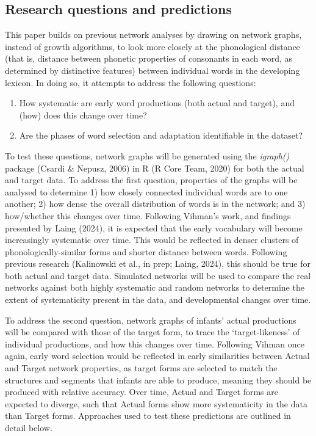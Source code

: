 \documentclass[
  man]{apa6}
\providecommand{\tightlist}{%
  \setlength{\itemsep}{0pt}\setlength{\parskip}{0pt}}
\begin{document}
\subsection{Research questions and predictions}\label{research-questions-and-predictions}

This paper builds on previous network analyses by drawing on network graphs, instead of growth algorithms, to look more closely at the phonological distance (that is, distance between phonetic properties of consonants in each word, as determined by distinctive features) between individual words in the developing lexicon. In doing so, it attempts to address the following questions:

\begin{enumerate}
\def\labelenumi{\arabic{enumi}.}
\tightlist
\item
  How systematic are early word productions (both actual and target), and (how) does this change over time?
\item
  Are the phases of word selection and adaptation identifiable in the dataset?
\end{enumerate}

To test these questions, network graphs will be generated using the \emph{igraph()} package (Csardi \& Nepusz, 2006) in R (R Core Team, 2020) for both the actual and target data. To address the first question, properties of the graphs will be analysed to determine 1) how closely connected individual words are to one another; 2) how dense the overall distribution of words is in the network; and 3) how/whether this changes over time. Following Vihman's work, and findings presented by Laing (2024), it is expected that the early vocabulary will become increasingly systematic over time. This would be reflected in denser clusters of phonologically-similar forms and shorter distance between words. Following previous research (Kalinowski et al., in prep; Laing, 2024), this should be true for both actual and target data. Simulated networks will be used to compare the real networks against both highly systematic and random networks to determine the extent of systematicity present in the data, and developmental changes over time.

To address the second question, network graphs of infants' actual productions will be compared with those of the target form, to trace the `target-likeness' of individual productions, and how this changes over time. Following Vihman once again, early word selection would be reflected in early similarities between Actual and Target network properties, as target forms are selected to match the structures and segments that infants are able to produce, meaning they should be produced with relative accuracy. Over time, Actual and Target forms are expected to diverge, such that Actual forms show more systematicity in the data than Target forms. Approaches used to test these predictions are outlined in detail below.
\end{document}
